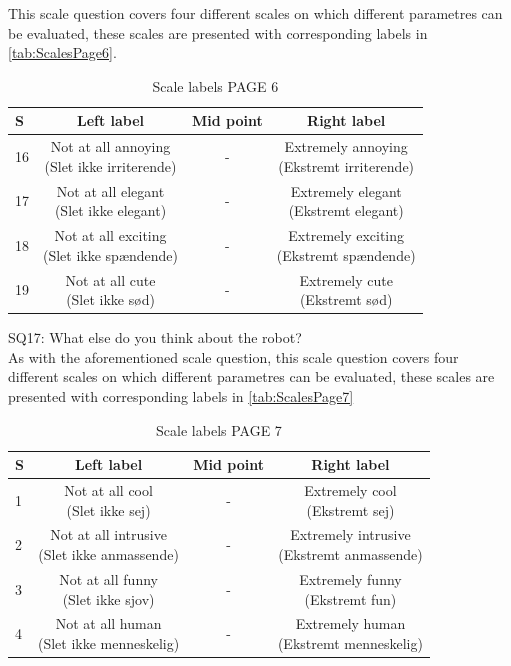 This scale question covers four different scales on which different parametres can be evaluated, these scales are presented with corresponding labels in \autoref{tab:ScalesPage6}. 
%
\begin{table}[H]
	\centering
\caption{Scale labels PAGE 6}
	\label{tab:ScalesPage6} 
	\begin{tabular}{l|c|c|c}
		S     & Left label & Mid point & Right label \\\hline
		16   & \makecell{Not at all annoying\\(Slet ikke irriterende)}  & - & \makecell{Extremely annoying \\(Ekstremt irriterende)}        \\\hline
		17   & \makecell{Not at all elegant \\(Slet ikke elegant)} & - & \makecell{Extremely elegant \\(Ekstremt elegant)}         \\\hline
		18   & \makecell{Not at all exciting\\(Slet ikke spændende)} & - & \makecell{Extremely exciting \\(Ekstremt spændende)}         \\\hline
	 	19   & \makecell{Not at all cute\\(Slet ikke sød)} & - & \makecell{Extremely cute \\(Ekstremt sød)}               
	\end{tabular}        
\end{table}
\noindent
%
SQ17: What else do you think about the robot?\\%
As with the aforementioned scale question, this scale question covers four different scales on which different parametres can be evaluated, these scales are presented with corresponding labels in \autoref{tab:ScalesPage7}  
%
\begin{table}[H]
	\centering
\caption{Scale labels PAGE 7}
	\label{tab:ScalesPage7} 
	\begin{tabular}{l|c|c|c}
		S    & Left label & Mid point & Right label \\\hline
		1   & \makecell{Not at all cool\\(Slet ikke sej)}  & - & \makecell{Extremely cool \\(Ekstremt sej)}        \\\hline
		2   & \makecell{Not at all intrusive \\(Slet ikke anmassende)} & - & \makecell{Extremely intrusive \\(Ekstremt anmassende)}         \\\hline
		3   & \makecell{Not at all funny\\(Slet ikke sjov)} & - & \makecell{Extremely funny \\(Ekstremt fun)}         \\\hline
	 	4   & \makecell{Not at all human \\(Slet ikke menneskelig)} & - & \makecell{Extremely human \\(Ekstremt menneskelig)}               
	\end{tabular}        
\end{table}
